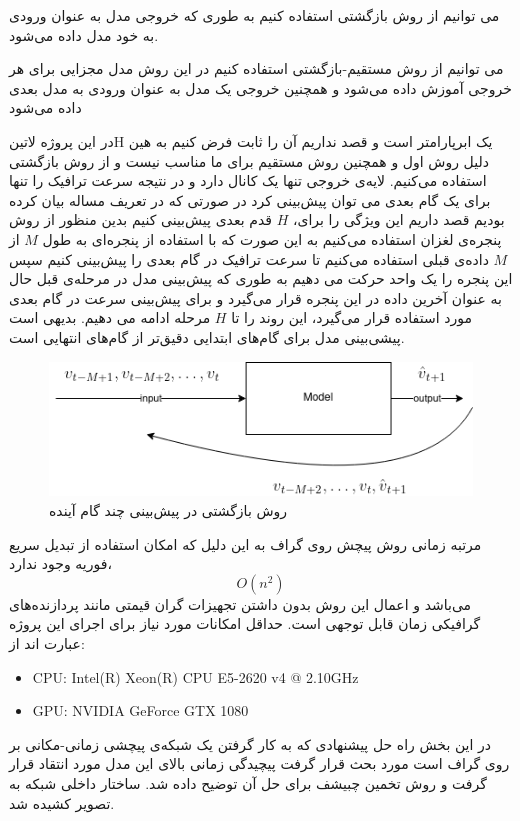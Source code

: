  می توانیم از روش بازگشتی  استفاده کنیم به طوری که خروجی مدل به عنوان ورودی به خود مدل داده می‌شود.

 می توانیم از روش مستقیم-بازگشتی  استفاده کنیم در این روش مدل مجزایی برای هر خروجی آموزش داده می‌شود و همچنین خروجی یک مدل به عنوان ورودی به مدل بعدی داده می‌شود


در این پروژه ‌لاتین{‌H} یک ابرپارامتر است و قصد نداریم آن را ثابت فرض کنیم به هین دلیل روش اول و همچنین روش مستقیم برای ما مناسب نیست و از روش بازگشتی استفاده می‌کنیم. لایه‌ی خروجی تنها یک کانال دارد و در نتیجه سرعت ترافیک را تنها برای یک گام بعدی می توان پیش‌بینی کرد در صورتی که در تعریف مساله بیان کرده بودیم قصد داریم این ویژگی را برای، $H$ قدم بعدی پیش‌بینی کنیم بدین منظور از روش پنجره‌ی لغزان استفاده می‌کنیم به این صورت که با استفاده از پنجره‌ای به طول $M$ از $M$ داده‌ی قبلی استفاده می‌کنیم تا سرعت ترافیک در گام بعدی را پیش‌بینی کنیم سپس این پنجره را یک واحد حرکت می دهیم به طوری که پیش‌بینی مدل در مرحله‌ی قبل حال به عنوان آخرین داده در این پنجره قرار می‌گیرد و برای پیش‌بینی سرعت در گام بعدی مورد استفاده قرار می‌گیرد، این روند را تا $H$ مرحله ادامه می دهیم. بدیهی است پیشی‌بینی مدل برای گام‌های ابتدایی دقیق‌تر از گام‌های انتهایی است.


\begin{figure}
  \includegraphics[width=\textwidth]{./images/recursive.png}
  \centering
  \caption{
روش بازگشتی در پیش‌بینی چند گام آینده }
  \label{fig:blocks}
\end{figure}


مرتبه زمانی روش پیچش روی گراف به این دلیل که امکان استفاده از تبدیل سریع فوریه وجود ندارد،
\[
  O(n^{2})
\]
می‌باشد و اعمال این روش بدون داشتن تجهیزات گران قیمتی مانند پردازنده‌های گرافیکی زمان قابل توجهی است. حداقل امکانات مورد نیاز برای اجرای این پروژه عبارت اند از:

\begin{latin}\begin{itemize}
\item CPU: Intel(R) Xeon(R) CPU E5-2620 v4 @ 2.10GHz
\item GPU: NVIDIA GeForce GTX 1080
\end{itemize}\end{latin}

در این بخش راه حل پیشنهادی که به کار گرفتن یک شبکه‌ی پیچشی زمانی-مکانی بر روی گراف است مورد بحث قرار گرفت پیچیدگی زمانی بالای این مدل مورد انتقاد قرار گرفت و روش تخمین چبیشف برای حل آن توضیح داده شد. ساختار داخلی شبکه به تصویر کشیده شد.
